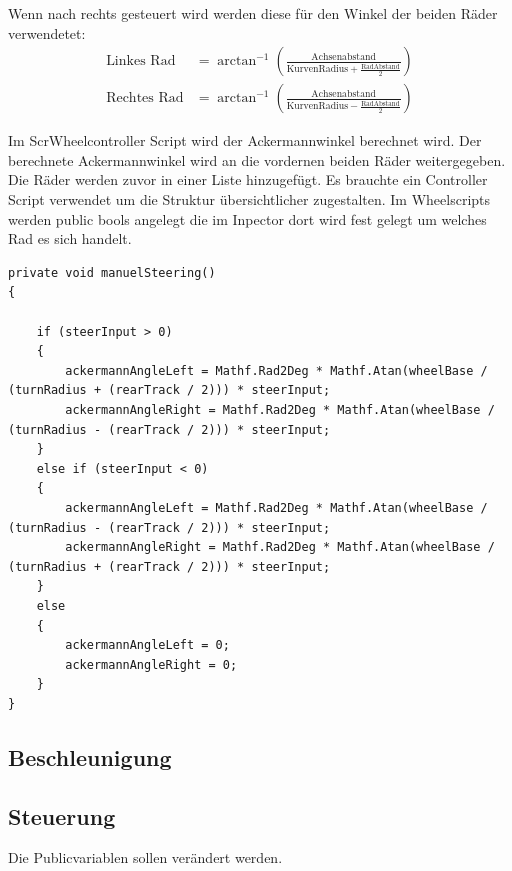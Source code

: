 Wenn nach rechts gesteuert wird werden diese für den Winkel der beiden Räder verwendetet:
\begin{align}
    \textrm{Linkes Rad}& =\arctan^{-1}\left(\frac{\textrm{Achsenabstand}}{\textrm{KurvenRadius}+\frac{\textrm{RadAbstand}}{2}}\right)\\
    \textrm{Rechtes Rad}& =\arctan^{-1}\left(\frac{\textrm{Achsenabstand}}{\textrm{KurvenRadius}-\frac{\textrm{RadAbstand}}{2}}\right) 
\end{align}

Im ScrWheelcontroller Script wird der Ackermannwinkel berechnet wird. Der berechnete Ackermannwinkel wird an die vordernen beiden Räder weitergegeben. Die Räder werden zuvor in einer Liste hinzugefügt.
Es brauchte ein Controller Script verwendet um die Struktur übersichtlicher zugestalten. Im Wheelscripts werden public bools angelegt die im Inpector dort wird fest gelegt um welches Rad es sich handelt.


\begin{lstlisting}
private void manuelSteering()
{
            
    if (steerInput > 0)
    {
        ackermannAngleLeft = Mathf.Rad2Deg * Mathf.Atan(wheelBase / (turnRadius + (rearTrack / 2))) * steerInput;
        ackermannAngleRight = Mathf.Rad2Deg * Mathf.Atan(wheelBase / (turnRadius - (rearTrack / 2))) * steerInput;
    }
    else if (steerInput < 0)
    {
        ackermannAngleLeft = Mathf.Rad2Deg * Mathf.Atan(wheelBase / (turnRadius - (rearTrack / 2))) * steerInput;
        ackermannAngleRight = Mathf.Rad2Deg * Mathf.Atan(wheelBase / (turnRadius + (rearTrack / 2))) * steerInput;
    }
    else
    {
        ackermannAngleLeft = 0;
        ackermannAngleRight = 0;
    }
}    
\end{lstlisting}


\subsection{Beschleunigung}
\subsection{Steuerung}

Die Publicvariablen sollen verändert werden.